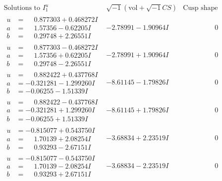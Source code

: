 \documentclass[1p]{elsarticle_modified}
\theoremstyle{definition}
\newcommand{\I}{\sqrt{-1}}
\begin{document}
$$\begin{array}{c|c|c}  
\text{Solutions to }I^u_{1}& \I (\text{vol} + \sqrt{-1}CS) & \text{Cusp shape}\\
 \hline 
\begin{aligned}
u &= \phantom{-}0.877303 + 0.468272 I \\
a &= \phantom{-}1.57356 - 0.62205 I \\
b &= \phantom{-}0.29748 + 2.26551 I\end{aligned}
 & -2.78991 - 1.90964 I & \phantom{-0.000000 } 0 \\ \hline\begin{aligned}
u &= \phantom{-}0.877303 - 0.468272 I \\
a &= \phantom{-}1.57356 + 0.62205 I \\
b &= \phantom{-}0.29748 - 2.26551 I\end{aligned}
 & -2.78991 + 1.90964 I & \phantom{-0.000000 } 0 \\ \hline\begin{aligned}
u &= \phantom{-}0.882422 + 0.437768 I \\
a &= -0.321281 - 1.299260 I \\
b &= -0.06255 - 1.51339 I\end{aligned}
 & -8.61145 - 1.79826 I & \phantom{-0.000000 } 0 \\ \hline\begin{aligned}
u &= \phantom{-}0.882422 - 0.437768 I \\
a &= -0.321281 + 1.299260 I \\
b &= -0.06255 + 1.51339 I\end{aligned}
 & -8.61145 + 1.79826 I & \phantom{-0.000000 } 0 \\ \hline\begin{aligned}
u &= -0.815077 + 0.543750 I \\
a &= \phantom{-}1.70139 + 2.08254 I \\
b &= \phantom{-}0.93293 - 2.67151 I\end{aligned}
 & -3.68834 + 2.23519 I & \phantom{-0.000000 } 0 \\ \hline\begin{aligned}
u &= -0.815077 - 0.543750 I \\
a &= \phantom{-}1.70139 - 2.08254 I \\
b &= \phantom{-}0.93293 + 2.67151 I\end{aligned}
 & -3.68834 - 2.23519 I & \phantom{-0.000000 } 0 \\ \hline\begin{aligned}

\end{aligned}
\end{array}$$
\end{document}
